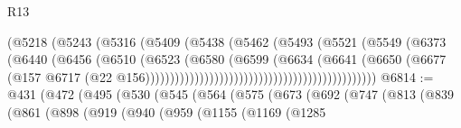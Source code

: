 \begin{lexlean}{R13}
\begin{coremodule}
                                                      (@5218
                                                        (@5243
                                                          (@5316
                                                            (@5409
                                                              (@5438
                                                                (@5462
                                                                  (@5493
                                                                    (@5521
                                                                      (@5549
                                                                        (@6373
                                                                          (@6440
                                                                            (@6456
                                                                              (@6510
                                                                                (@6523
                                                                                  (@6580
                                                                                    (@6599
                                                                                      (@6634
                                                                                        (@6641
                                                                                          (@6650
                                                                                            (@6677
                                                                                              (@157
                                                                                                @6717
                                                                                                (@22
                                                                                                  @156)))))))))))))))))))))))))))))))))))))))))))))))
@6814 := @431
    (@472
      (@495
        (@530
          (@545
            (@564
              (@575
                (@673
                  (@692
                    (@747
                      (@813
                        (@839
                          (@861
                            (@898
                              (@919
                                (@940
                                  (@959
                                    (@1155
                                      (@1169
                                        (@1285

\end{coremodule}
\end{lexlean}
